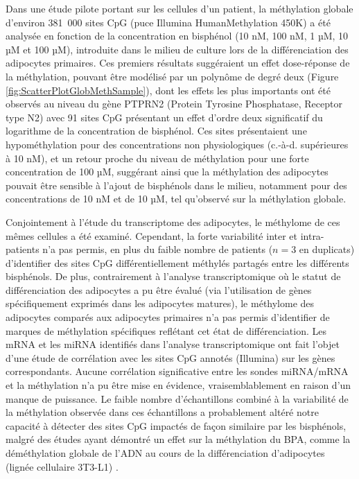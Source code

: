 \documentclass[11pt,a4paper,notrimn]{krantz}
\theoremstyle{definition}
\theoremstyle{definition}
\theoremstyle{remark}
\begin{document}
Dans une étude pilote portant sur les cellules d'un patient, la
méthylation globale d'environ 381~000 sites CpG (puce Illumina
HumanMethylation 450K) a été analysée en fonction de la concentration en
bisphénol (10 nM, 100 nM, 1 µM, 10 µM et 100 µM), introduite dans le
milieu de culture lors de la différenciation des adipocytes primaires.
Ces premiers résultats suggéraient un effet dose-réponse de la
méthylation, pouvant être modélisé par un polynôme de degré deux (Figure
\ref{fig:ScatterPlotGlobMethSample}), dont les effets les plus
importants ont été observés au niveau du gène PTPRN2 (Protein Tyrosine
Phosphatase, Receptor type N2) avec 91 sites CpG présentant un effet
d'ordre deux significatif du logarithme de la concentration de
bisphénol. Ces sites présentaient une hypométhylation pour des
concentrations non physiologiques (c.-à-d. supérieures à 10 nM), et un
retour proche du niveau de méthylation pour une forte concentration de
100 µM, suggérant ainsi que la méthylation des adipocytes pouvait être
sensible à l'ajout de bisphénols dans le milieu, notamment pour des
concentrations de 10 nM et de 10 µM, tel qu'observé sur la méthylation
globale.

Conjointement à l'étude du transcriptome des adipocytes, le méthylome de
ces mêmes cellules a été examiné. Cependant, la forte variabilité inter
et intra-patients n'a pas permis, en plus du faible nombre de patients
(\(n=3\) en duplicats) d'identifier des sites CpG différentiellement
méthylés partagés entre les différents bisphénols. De plus,
contrairement à l'analyse transcriptomique où le statut de
différenciation des adipocytes a pu être évalué (via l'utilisation de
gènes spécifiquement exprimés dans les adipocytes matures), le méthylome
des adipocytes comparés aux adipocytes primaires n'a pas permis
d'identifier de marques de méthylation spécifiques reflétant cet état de
différenciation. Les mRNA et les miRNA identifiés dans l'analyse
transcriptomique ont fait l'objet d'une étude de corrélation avec les
sites CpG annotés (Illumina) sur les gènes correspondants. Aucune
corrélation significative entre les sondes miRNA/mRNA et la méthylation
n'a pu être mise en évidence, vraisemblablement en raison d'un manque de
puissance. Le faible nombre d'échantillons combiné à la variabilité de
la méthylation observée dans ces échantillons a probablement altéré
notre capacité à détecter des sites CpG impactés de façon similaire par
les bisphénols, malgré des études ayant démontré un effet sur la
méthylation du BPA, comme la déméthylation globale de l'ADN au cours de
la différenciation d'adipocytes (lignée cellulaire 3T3-L1)
\citep{bastos_sales_effects_2013}.
\end{document}

